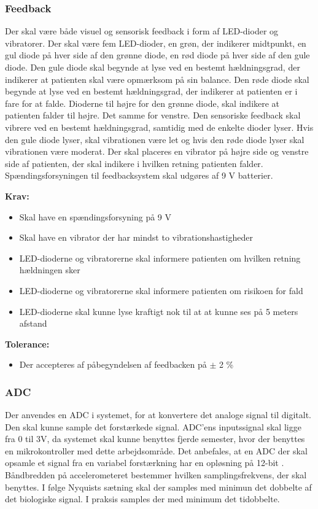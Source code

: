 \subsubsection{Feedback}
Der skal være både visuel og sensorisk feedback i form af LED-dioder og vibratorer. Der skal være fem LED-dioder, en grøn, der indikerer midtpunkt, en gul diode på hver side af den grønne diode, en rød diode på hver side af den gule diode. Den gule diode skal begynde at lyse ved en bestemt hældningsgrad, der indikerer at patienten skal være opmærksom på sin balance. Den røde diode skal begynde at lyse ved en bestemt hældningsgrad, der indikerer at patienten er i fare for at falde. Dioderne til højre for den grønne diode, skal indikere at patienten falder til højre. Det samme  for venstre. Den sensoriske feedback skal vibrere ved en bestemt hældningsgrad, samtidig med de enkelte dioder lyser. Hvis den gule diode lyser, skal vibrationen være let og hvis den røde diode lyser skal vibrationen være moderat. Der skal placeres en vibrator på højre side og venstre side af patienten, der skal indikere i hvilken retning patienten falder. Spændingsforsyningen til feedbacksystem skal udgøres af 9 V batterier.

\textbf{Krav:}
\begin{itemize}
\item Skal have en spændingsforsyning på 9 V
\item Skal have en vibrator der har mindst to vibrationshastigheder
\item LED-dioderne og vibratorerne skal informere patienten om hvilken retning hældningen sker
\item LED-dioderne og vibratorerne skal informere patienten om risikoen for fald
\item LED-dioderne skal kunne lyse kraftigt nok til at at kunne ses på 5 meters afstand
\end{itemize}

\textbf{Tolerance:}
\begin{itemize}
\item Der accepteres af påbegyndelsen af feedbacken på $\pm$ 2 \%
\end{itemize}

\subsubsection{ADC}
Der anvendes en ADC i systemet, for at konvertere det analoge signal til digitalt. Den skal kunne sample det forstærkede signal. ADC'ens inputssignal skal ligge fra 0 til 3V, da systemet skal kunne benyttes fjerde semester, hvor der benyttes en mikrokontroller med dette arbejdsområde. Det anbefales, at en ADC der skal opsamle et signal fra en variabel forstærkning har en opløsning på 12-bit \cite{Zouridakis2003}. Båndbredden på accelerometeret bestemmer hvilken samplingsfrekvens, der skal benyttes. I følge Nyquists sætning skal der samples med minimun det dobbelte af det biologiske signal. I praksis samples der med minimum det tidobbelte.

